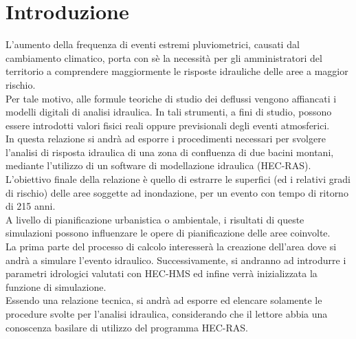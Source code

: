 \section{Introduzione}
L'aumento della frequenza di eventi estremi pluviometrici, causati dal cambiamento climatico, porta con sè la necessità per gli amministratori del territorio a comprendere maggiormente le risposte idrauliche delle aree a maggior rischio.\\
Per tale motivo, alle formule teoriche di studio dei deflussi vengono affiancati i modelli digitali di analisi idraulica. In tali strumenti, a fini di studio, possono essere introdotti valori fisici reali oppure previsionali degli eventi atmosferici.\\ 
In questa relazione si andrà ad esporre i procedimenti necessari per svolgere l'analisi di risposta idraulica di una zona di confluenza di due bacini montani, mediante l'utilizzo di un software di modellazione idraulica (HEC-RAS). L'obiettivo finale della relazione è quello di estrarre le superfici (ed i relativi gradi di rischio) delle aree soggette ad inondazione, per un evento con tempo di ritorno di 215 anni.\\
A livello di pianificazione urbanistica o ambientale, i risultati di queste simulazioni possono influenzare le opere di pianificazione delle aree coinvolte.\\
La prima parte del processo di calcolo interesserà la creazione dell'area dove si andrà a simulare l'evento idraulico. Successivamente, si andranno ad introdurre i parametri idrologici valutati con HEC-HMS ed infine verrà inizializzata la funzione di simulazione.\\
Essendo una relazione tecnica, si andrà ad esporre ed elencare solamente le procedure svolte per l'analisi idraulica, considerando che il lettore abbia una conoscenza basilare di utilizzo del programma HEC-RAS.